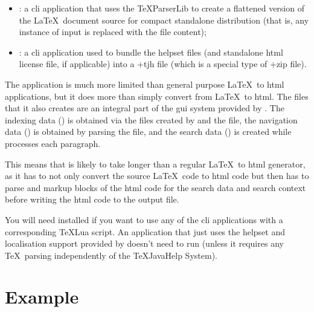 \documentclass[toc=listof]{scrreport}
\begin{document}
\begin{itemize}
\item {}: a \gls{cli} application that uses the
\gls{TeXParserLib} to create a flattened version of the \LaTeX\ document
source for compact standalone distribution (that is, any instance of
\gls{input} is replaced with the file content);

\item {}: a \gls{cli} application used to bundle
the helpset files (and standalone \gls{html} license file, if applicable) into
a \ext+{tjh} file (which is a special type of \ext+{zip} file).
\end{itemize}

The  application is much more limited than
general purpose \LaTeX\ to \gls{html} applications, but it does more
than simply convert from \LaTeX\ to \gls{html}. The  files
that it also creates are an integral part of the \gls{gui} system
provided by . The indexing data
() is obtained via the  files created by  
and the  file, the navigation data () is obtained 
by parsing the  file, and the search data ()
is created while  processes each paragraph.

This means that  is likely to take longer than a
regular \LaTeX\ to \gls{html} generator, as it has to not only
convert the source \LaTeX\ code to \gls{html} code but then has to
parse and markup blocks of the \gls{html} code for the search data
and search context before writing the \gls{html} code to the output file.

\begin{information}
You will need  installed if you want to
use any of the \gls{cli} applications with a corresponding \TeX Lua
script. An application that just uses the helpset and localisation
support provided by  doesn't need
 to run (unless it requires any \TeX\
parsing independently of the \gls{TeXJavaHelp} System).
\end{information}

\chapter{Example}\label{sec:example}
\end{document}
